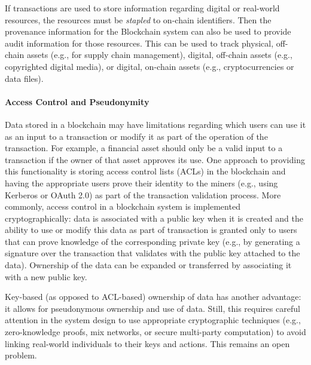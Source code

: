 If transactions are used to store information regarding digital or real-world resources, the resources must be \emph{stapled} to on-chain identifiers. Then the provenance information for the Blockchain system can also be used to provide audit information for those resources.
This can be used to track physical, off-chain assets (e.g., for supply chain management), digital, off-chain assets (e.g., copyrighted digital media), or digital, on-chain assets (e.g., cryptocurrencies or data files).
 
\paragraph{Access Control and Pseudonymity}
Data stored in a blockchain may have limitations regarding which users can use it as an input to a transaction or modify it as part of the operation of the transaction.
For example, a financial asset should only be a valid input to a transaction if the owner of that asset approves its use.
One approach to providing this functionality is storing access control lists (ACLs) in the blockchain and having the appropriate users prove their identity to the miners (e.g., using Kerberos or OAuth 2.0) as part of the transaction validation process.
More commonly, access control in a blockchain system is implemented cryptographically: data is associated with a public key when it is created and the ability to use or modify this data as part of transaction is granted only to users that can prove knowledge of the corresponding private key (e.g., by generating a signature over the transaction that validates with the public key attached to the data).
Ownership of the data can be expanded or transferred by associating it with a new public key.


Key-based (as opposed to ACL-based) ownership of data has another advantage: it allows for pseudonymous ownership and use of data.
Still, this requires careful attention in the system design to use appropriate cryptographic techniques (e.g., zero-knowledge proofs, mix networks, or secure multi-party computation) to avoid linking real-world individuals to their keys and actions. This remains an open problem.

